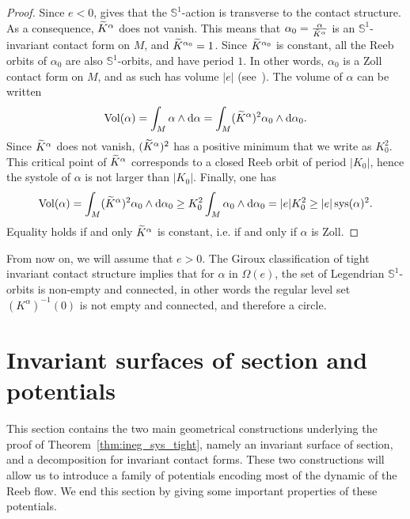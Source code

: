 \documentclass[AHL,Unicode,longabstracts]{cedram}
\DeclareMathOperator{\vol}{Vol}
\DeclareMathOperator{\sys}{sys}
\newcommand{\bbS}{\mathbb{S}}
\newcommand{\rmd}{\mathrm{d}}
\let\oldtilde\tilde
\renewcommand*{\tilde}[1]{\mathchoice{\widetilde{#1}}{\widetilde{#1}}{\oldtilde{#1}}{\oldtilde{#1}}}
\newcommand{\bbS}{\mathbb{S}}
\begin{document}
\begin{proof}
Since $e<0$, \cite[Theorem~1.1]{Giroux1999StructuresDC} gives that the $\bbS^1$-action is transverse to the contact structure. As a consequence, $\tilde K^\alpha$ does not vanish. This means that $\alpha_0 = \frac{\alpha}{\tilde K^\alpha}$ is an $\bbS^1$-invariant contact form on $M$, and $\tilde K^{\alpha_0} = 1$. Since $\tilde K^{\alpha_0}$ is constant, all the Reeb orbits of $\alpha_0$ are also $\bbS^1$-orbits, and have period $1$. In other words, $\alpha_0$ is a Zoll contact form on $M$, and as such has volume $|e|$ (see~\cite[Proposition~3.3]{paiva_2014_contact}). The volume of $\alpha$ can be written
\[
\vol(\alpha) = \int_{M} \alpha \wedge \rmd \alpha = \int_{M} (\tilde K^\alpha)^2 \alpha_0 \wedge \rmd \alpha_0.
\]
Since $\tilde K^\alpha$ does not vanish, $(\tilde K^\alpha)^2$ has a positive minimum that we write as $K_0^2$. This critical point of $\tilde K^\alpha$ corresponds to a closed Reeb orbit of period $|K_0|$, hence the systole of $\alpha$ is not larger than $|K_0|$. Finally, one has
\[
\vol(\alpha) = \int_{M} (\tilde K^\alpha)^2 \alpha_0 \wedge \rmd \alpha_0 \geq K_0^2 \int_{M} \alpha_0 \wedge \rmd \alpha_0 = |e|K_0^2 \geq |e|\sys(\alpha)^2.
\]
Equality holds if and only $\tilde K^\alpha$ is constant, i.e. if and only if $\alpha$ is Zoll.
\end{proof}

\begin{rema}\label{remark:tight_K_connected}
From now on, we will assume that $e>0$. The Giroux classification of tight invariant contact structure implies that for $\alpha$ in $\Omega(e)$, the set of Legendrian $\bbS^1$-orbits is non-empty and connected, in other words the regular level set $(K^\alpha)^{-1}(0)$ is not empty and connected, and therefore a circle.
\end{rema}

\section{Invariant surfaces of section and potentials}\label{sec:inv_surface_of_section_and_potentials}

This section contains the two main geometrical constructions underlying the proof of Theorem~\ref{thm:ineg_sys_tight}, namely an invariant surface of section, and a decomposition for invariant contact forms. These two constructions will allow us to introduce a family of potentials encoding most of the dynamic of the Reeb flow. We end this section by giving some important properties of these potentials.
\end{document}
